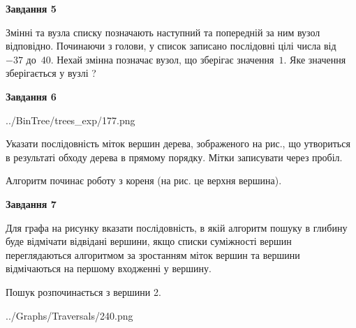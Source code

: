 \documentclass[12pt, ukrainian]{article}
\begin{document}
{\begin {large}
{\begin {center}\textbf{Завдання 5}\end {center}}\par
Змінні  та  вузла списку позначають наступний та попередній за ним вузол відповідно. Починаючи з голови, у список записано послідовні цілі числа від~$-37$ до~$40$. Нехай змінна  позначає вузол, що зберігає значення~$1$.
Яке значення зберігається у вузлі  ?\par
\newpage

{\begin {center}\textbf{Завдання 6}\end {center}}\par

\begin{center}
	{../BinTree/trees_exp/177.png}
\end{center}
Указати послідовність міток вершин дерева, зображеного на рис., що утвориться в результаті обходу дерева в прямому порядку. Мітки записувати через пробіл.\par Алгоритм починає роботу з кореня (на рис. це верхня вершина).\par
\newpage

{\begin {center}\textbf{Завдання 7}\end {center}}\par
Для графа на рисунку вказати послідовність, в якій алгоритм пошуку в глибину буде відмічати відвідані вершини, якщо списки суміжності вершин переглядаються алгоритмом за зростанням міток вершин та вершини відмічаються на першому вход\-женні у вершину.\par
Пошук розпочинається з вершини 2.\par

\begin{center}
	{../Graphs/Traversals/240.png}
\end{center}\par
\newpage


\end{large}}
\end{document}
